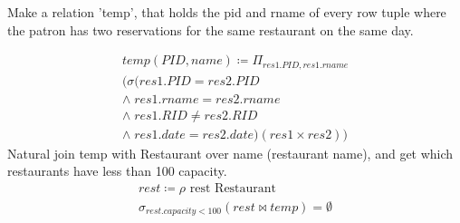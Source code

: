 \documentclass{article}
\begin{document}
\begin{enumerate}
		Make a relation 'temp', that holds the pid and rname of every row tuple where the patron has two reservations for the same restaurant on the same day. 
		 
		\begin{align}
       	temp(PID, name)\coloneqq \Pi_{res1.PID,res1.rname}\\(\sigma(res1.PID=res2.PID \\ \wedge \; res1.rname = res2.rname\\ \wedge\; res1.RID \neq res2.RID \\ \wedge \; res1.date = res2.date)(res1 \times res2))
		\end{align} 
		Natural join temp with Restaurant over name (restaurant name), and get which restaurants have less than 100 capacity.
		 \begin{align}
		 rest \coloneqq \rho \text{  rest Restaurant}\\ 
		 \sigma_{rest.capacity < 100} (rest \bowtie temp) = \emptyset
		 \end{align}
		
\end{enumerate}
\end{document}
